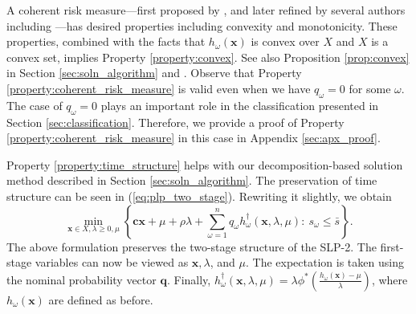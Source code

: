 \documentclass[opre,nonblindrev]{informs3} %
\newcommand{\x}{\mathbf{x}}
\renewcommand{\c}{\mathbf{c}}
\newcommand{\q}{\mathbf{q}}
\begin{document}
A coherent risk measure---first proposed by \cite{Artzner_et_al_1999}, and later refined by several authors including \cite{rockafellar2007coherent,shaDR:09}---has desired properties including convexity and monotonicity.  
These properties, combined with the facts that $h_\omega(\x)$ is convex over $X$ and $X$ is a convex set, implies Property \ref{property:convex}.  
See also Proposition \ref{prop:convex} in Section \ref{sec:soln_algorithm} and \cite{bental2013robust}. 
Observe that Property \ref{property:coherent_risk_measure} is valid even when we have $q_\omega=0$ for some $\omega$.
The case of $q_\omega = 0$ plays an important role in the classification presented in Section \ref{sec:classification}. 
Therefore, we provide a proof of Property \ref{property:coherent_risk_measure} in this case in Appendix \ref{sec:apx_proof}. 


Property \ref{property:time_structure} helps with our decomposition-based solution method described in Section \ref{sec:soln_algorithm}. 
The preservation of time structure can be seen in (\ref{eq:plp_two_stage}).  
Rewriting it slightly, we obtain
\begin{equation}
\label{eq:dec}
\min_{\x \in X,\lambda \geq 0,\mu} \left\{ \c\x + \mu + \rho \lambda +  \sum_{\omega=1}^{n} q_\omega h_\omega^{\dagger}(\x, \lambda, \mu) \colon \ s_\omega \leq \bar{s} \right\}.
\end{equation}
The above formulation preserves the two-stage structure of the SLP-2.
The first-stage variables can now be viewed as $\x, \lambda$, and $\mu$. 
The expectation is taken using the nominal probability vector $\q$. 
Finally, $ h^{\dagger}_\omega(\x, \lambda, \mu) =  \lambda \phi^*\left(\frac{h_\omega(\x) - \mu}{\lambda} \right)$,
 where $h_\omega(\x)$ are defined as before. 
\end{document}
